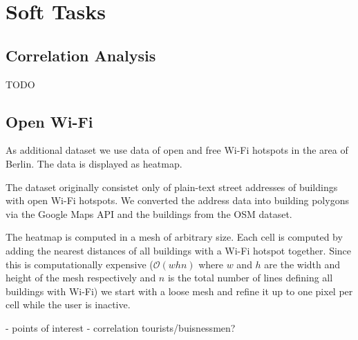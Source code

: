 \section{Soft Tasks}
\subsection{Correlation Analysis}

TODO

\subsection{Open Wi-Fi}

As additional dataset we use data of open and free Wi-Fi hotspots in
the area of Berlin.
The data is displayed as heatmap.

The dataset originally consistet only of plain-text street addresses
of buildings with open Wi-Fi hotspots. We converted the
address data into building polygons via the Google Maps
API and the buildings from the OSM dataset.

The heatmap is computed in a mesh of
arbitrary size. Each cell is computed by adding
the nearest distances of all buildings with a Wi-Fi
hotspot together.
Since this is computationally expensive ($\mathcal{O}(whn)$ where $w$ and $h$
are the width and height of the mesh respectively and $n$ is the total number of lines
defining all buildings with Wi-Fi)
we start with a loose mesh and refine it up to one pixel per cell while the
user is inactive.

- points of interest
- correlation tourists/buisnessmen?